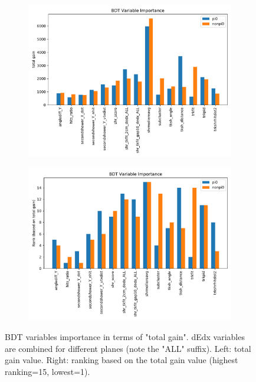\documentclass[a4paper]{article}
\begin{document}
\begin{figure}[H] 
\begin{center}
    \begin{subfigure}[b]{0.45\textwidth}
    \centering
    \includegraphics[width=1.00\textwidth]{1eNp/bdt_var_gain.pdf}
    \caption{\label{fig:1eNp:bdt:var:gain}}
    \end{subfigure}
    \begin{subfigure}[b]{0.45\textwidth}
    \centering
    \includegraphics[width=1.00\textwidth]{1eNp/bdt_var_rank.pdf}
    \caption{\label{fig:1eNp:bdt:var:rank}}
    \end{subfigure}
\caption{\label{ffig:1eNp:bdt:var} BDT variables importance in terms of "total gain". dEdx variables are combined for different planes (note the "ALL" suffix). Left: total gain value. Right: ranking based on the total gain value (highest ranking=15, lowest=1).}
\end{center}
\end{figure}
\end{document}
